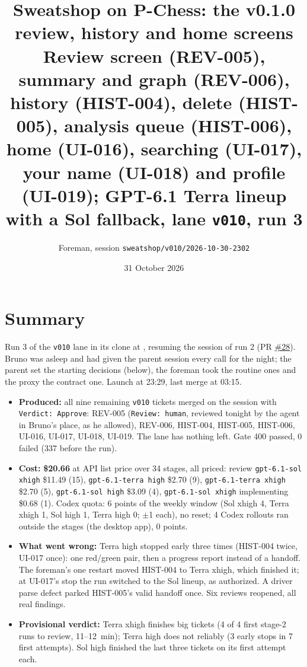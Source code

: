 \documentclass[11pt,a4paper]{article}
\title{Sweatshop on P-Chess: the v0.1.0 review, history and home screens\\\large Review screen (REV-005), summary and graph (REV-006), history (HIST-004), delete (HIST-005), analysis queue (HIST-006), home (UI-016), searching (UI-017), your name (UI-018) and profile (UI-019); GPT-6.1 Terra lineup with a Sol fallback, lane \texttt{v010}, run 3}
\author{Foreman, session \texttt{sweatshop/v010/2026-10-30-2302}}
\date{31 October 2026}
\begin{document}
\maketitle

\section*{Summary}

Run 3 of the \texttt{v010} lane in its clone at , resuming the
session of run 2 (PR \href{https://github.com/Laginho/P-Chess/pull/28}{\#28}). Bruno was asleep
and had given the parent session every call for the night; the parent set the starting decisions
(below), the foreman took the routine ones and the proxy the contract one. Launch at 23:29, last
merge at 03:15.

\begin{itemize}
  \item \textbf{Produced:} all nine remaining \texttt{v010} tickets merged on the session with
        \texttt{Verdict: Approve}: REV-005 (\texttt{Review: human}, reviewed tonight by the agent
        in Bruno's place, as he allowed), REV-006, HIST-004, HIST-005, HIST-006, UI-016, UI-017,
        UI-018, UI-019. The lane has nothing left. Gate 400 passed, 0 failed (337 before the run).
  \item \textbf{Cost:} \textbf{\$20.66} at API list price over 34 stages, all priced: review
        \texttt{gpt-6.1-sol xhigh} \$11.49 (15), \texttt{gpt-6.1-terra high} \$2.70 (9),
        \texttt{gpt-6.1-terra xhigh} \$2.70 (5), \texttt{gpt-6.1-sol high} \$3.09 (4),
        \texttt{gpt-6.1-sol xhigh} implementing \$0.68 (1). Codex quota: 6 points of the weekly
        window (Sol xhigh 4, Terra xhigh 1, Sol high 1, Terra high 0; $\pm$1 each), no reset;
        4 Codex rollouts ran outside the stages (the desktop app), 0 points.
  \item \textbf{What went wrong:} Terra high stopped early three times (HIST-004 twice, UI-017
        once): one red/green pair, then a progress report instead of a handoff. The foreman's one
        restart moved HIST-004 to Terra xhigh, which finished it; at UI-017's stop the run
        switched to the Sol lineup, as authorized. A driver parse defect parked HIST-005's valid
        handoff once. Six reviews reopened, all real findings.
  \item \textbf{Provisional verdict:} Terra xhigh finishes big tickets (4 of 4 first stage-2 runs
        to review, 11--12~min); Terra high does not reliably (3 early stops in 7 first attempts).
        Sol high finished the last three tickets on its first attempt each.
\end{itemize}
\end{document}
